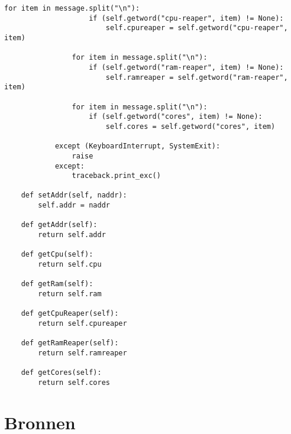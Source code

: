 \documentclass[DIV=calc]{scrartcl}
\begin{document}
\begin{lstlisting}[caption={broadcast\_recieve.py}, label=luister op poort en ontvangt data]
                for item in message.split("\n"):
                    if (self.getword("cpu-reaper", item) != None):
                        self.cpureaper = self.getword("cpu-reaper", item)
 
                for item in message.split("\n"):
                    if (self.getword("ram-reaper", item) != None):
                        self.ramreaper = self.getword("ram-reaper", item)
 
                for item in message.split("\n"):
                    if (self.getword("cores", item) != None):
                        self.cores = self.getword("cores", item)                                        
 
            except (KeyboardInterrupt, SystemExit):
                raise
            except:
                traceback.print_exc()
 
    def setAddr(self, naddr):
        self.addr = naddr
 
    def getAddr(self):
        return self.addr
 
    def getCpu(self):
        return self.cpu
 
    def getRam(self):
        return self.ram
 
    def getCpuReaper(self):
        return self.cpureaper
 
    def getRamReaper(self):
        return self.ramreaper
 
    def getCores(self):
        return self.cores
\end{lstlisting}
\section{Bronnen}
\end{document}
